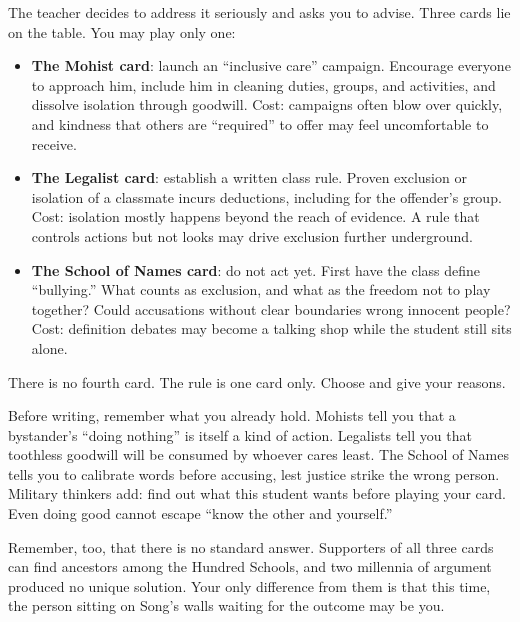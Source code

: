 The teacher decides to address it seriously and asks you to advise. Three cards lie on the table. You may play only one:

\begin{itemize}
\item \textbf{The Mohist card}: launch an ``inclusive care'' campaign. Encourage everyone to approach him, include him in cleaning duties, groups, and activities, and dissolve isolation through goodwill. Cost: campaigns often blow over quickly, and kindness that others are ``required'' to offer may feel uncomfortable to receive.
\item \textbf{The Legalist card}: establish a written class rule. Proven exclusion or isolation of a classmate incurs deductions, including for the offender's group. Cost: isolation mostly happens beyond the reach of evidence. A rule that controls actions but not looks may drive exclusion further underground.
\item \textbf{The School of Names card}: do not act yet. First have the class define ``bullying.'' What counts as exclusion, and what as the freedom not to play together? Could accusations without clear boundaries wrong innocent people? Cost: definition debates may become a talking shop while the student still sits alone.
\end{itemize}
There is no fourth card. The rule is one card only. Choose and give your reasons.

Before writing, remember what you already hold. Mohists tell you that a bystander's ``doing nothing'' is itself a kind of action. Legalists tell you that toothless goodwill will be consumed by whoever cares least. The School of Names tells you to calibrate words before accusing, lest justice strike the wrong person. Military thinkers add: find out what this student wants before playing your card. Even doing good cannot escape ``know the other and yourself.''

Remember, too, that there is no standard answer. Supporters of all three cards can find ancestors among the Hundred Schools, and two millennia of argument produced no unique solution. Your only difference from them is that this time, the person sitting on Song's walls waiting for the outcome may be you.
